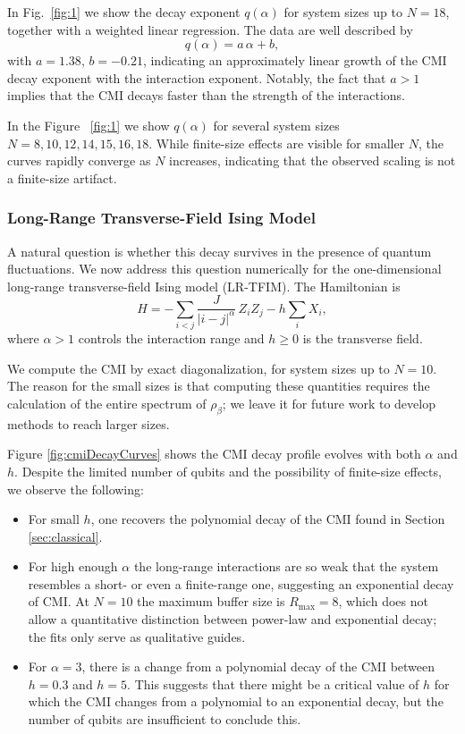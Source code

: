 \documentclass[11pt]{article}
\numberwithin{equation}{section}
\numberwithin{figure}{section}
\numberwithin{table}{section}
\theoremstyle{definition}
\theoremstyle{plain}
\theoremstyle{remark}
\begin{document}
In Fig.~\ref{fig:1} we show the decay exponent $q(\alpha)$ for system sizes up to $N=18$, together with a weighted linear regression. The data are well described by
\begin{equation}
q(\alpha)=a\,\alpha+b,
\end{equation}
with $
a= 1.38, \, b= -0.21$,
indicating an approximately linear growth of the CMI decay exponent with the interaction exponent.
Notably, the fact that $a>1$ implies that the CMI decays faster than the strength of the interactions. 


In the Figure ~\ref{fig:1} we show $q(\alpha)$ for several system sizes $N=8,10,12,14,15,16,18$. While finite-size effects are visible for smaller $N$, the curves rapidly converge as $N$ increases, indicating that the observed scaling is not a finite-size artifact.


\subsubsection{Long-Range Transverse-Field Ising Model}
\label{sec:LR-TFIM}

  
A natural question is whether this decay survives in the
presence of quantum fluctuations.  We now address this
question numerically for the one-dimensional long-range
transverse-field Ising model (LR-TFIM). The Hamiltonian is
%
\begin{equation}
  H = -\sum_{i < j} \frac{J}{|i-j|^{\alpha}}\,Z_i Z_j
      - h \sum_{i} X_i ,
  \label{eq:H}
\end{equation}
%
where $\alpha > 1$ controls the interaction range and $h \geq 0$
is the transverse field. 

We compute the CMI by exact diagonalization, for system sizes up to $N=10$. The reason for the small sizes is that computing these quantities requires the calculation of the entire spectrum of $\rho_\beta$; we leave it for future work to develop methods to reach larger sizes.


Figure \ref{fig:cmiDecayCurves} shows the CMI decay profile evolves with both $\alpha$ and $h$. Despite the limited number of qubits and the possibility of finite-size effects, we observe the following:
\begin{itemize}
    \item For small $h$, one recovers the polynomial decay of the CMI found in Section \ref{sec:classical}.
    \item For high enough $\alpha$ the long-range interactions are so weak  that the system resembles a short- or even a finite-range one, suggesting an exponential decay of CMI. At $N=10$ the maximum buffer size is $R_\mathrm{max} = 8$, which does not allow a quantitative distinction between power-law and exponential decay; the fits only serve as qualitative guides.
    \item For $\alpha=3$, there is a change from a polynomial decay of the CMI between $h=0.3$ and $h=5$. This suggests that there might be a critical value of $h$ for which the CMI changes from a polynomial to an exponential decay, but the number of qubits are insufficient to conclude this.
\end{itemize}
\end{document}
